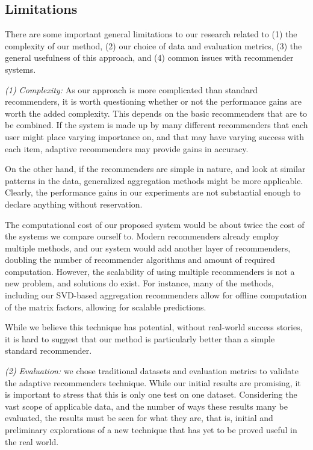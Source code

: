 \subsection{Limitations}

There are some important general limitations to our research
related to 
(1) the complexity of our method, 
(2) our choice of data and evaluation metrics, 
(3) the general usefulness of this approach, and
(4) common issues with recommender systems.

\emph{(1) Complexity:} As our approach is more complicated than standard recommenders,
it is worth questioning whether or not the performance gains are worth the added complexity.
This depends on the basic recommenders that are to be combined.
If the system is made up by many different recommenders
that each user might place varying importance on,
and that may have varying success with each item,
adaptive recommenders may provide gains in accuracy.

On the other hand, if the recommenders are simple in nature,
and look at similar patterns in the data,
generalized aggregation methods might be more applicable.
Clearly, the performance gains in our experiments
are not substantial enough to declare anything without reservation.

The computational cost of our proposed system would be about twice the cost of the systems we compare ourself to.
Modern recommenders already employ multiple methods, and our system would add another layer
of recommenders, doubling the number of recommender algorithms and amount of required computation.
However, the scalability of using multiple recommenders is not a new problem, and solutions do exist.
For instance, many of the methods, including our SVD-based aggregation recommenders allow for offline 
computation of the matrix factors, allowing for scalable predictions.

While we believe this technique has potential,
without real-world success stories, it is hard
to suggest that our method is particularly better
than a simple standard recommender.

\emph{(2) Evaluation:} we chose traditional datasets and evaluation metrics
to validate the adaptive recommenders technique.
While our initial results are promising, it is important to stress
that this is only one test on one dataset. Considering the vast scope
of applicable data, and the number of ways these results many be 
evaluated, the results must be seen for what they are,
that is, initial and preliminary explorations of a new technique
that has yet to be proved useful in the real world.

